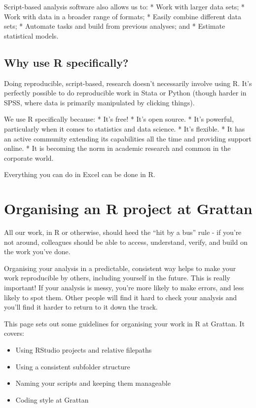\documentclass[]{book}
\providecommand{\tightlist}{%
  \setlength{\itemsep}{0pt}\setlength{\parskip}{0pt}}
\begin{document}
Script-based analysis software also allows us to:
* Work with larger data sets;
* Work with data in a broader range of formats;
* Easily combine different data sets;
* Automate tasks and build from previous analyses; and
* Estimate statistical models.

\hypertarget{why-R}{%
\section{Why use R specifically?}\label{why-R}}

Doing reproducible, script-based, research doesn't necessarily involve using R. It's perfectly possible to do reproducible work in Stata or Python (though harder in SPSS, where data is primarily manipulated by clicking things).

We use R specifically because:
* It's free!
* It's open source.
* It's powerful, particularly when it comes to statistics and data science.
* It's flexible.
* It has an active community extending its capabilities all the time and providing support online.
* It is becoming the norm in academic research and common in the corporate world.

Everything you can do in Excel can be done in R.

\hypertarget{organising-projects}{%
\chapter{Organising an R project at Grattan}\label{organising-projects}}

All our work, in R or otherwise, should heed the ``hit by a bus'' rule - if you're not around, colleagues should be able to access, understand, verify, and build on the work you've done.

Organising your analysis in a predictable, consistent way helps to make your work reproducible by others, including yourself in the future. This is really important! If your analysis is messy, you're more likely to make errors, and less likely to spot them. Other people will find it hard to check your analysis and you'll find it harder to return to it down the track.

This page sets out some guidelines for organising your work in R at Grattan. It covers:

\begin{itemize}
\tightlist
\item
  Using RStudio projects and relative filepaths
\item
  Using a consistent subfolder structure
\item
  Naming your scripts and keeping them manageable
\item
  Coding style at Grattan
\end{itemize}
\end{document}
